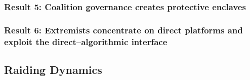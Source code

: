 \documentclass[12pt]{article}
\begin{document}
\subsubsection{Result 5: Coalition governance creates protective enclaves}

%
%
%

\subsubsection{Result 6: Extremists concentrate on direct platforms and exploit the direct–algorithmic interface}

%
%

\subsection{Raiding Dynamics}
\label{sec:results_raiding}

\end{document}

